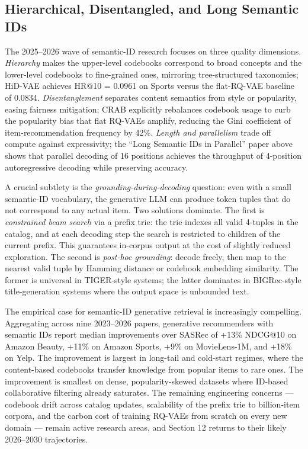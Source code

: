 \documentclass{article}
\begin{document}
\subsection{Hierarchical, Disentangled, and Long Semantic IDs}\label{hierarchical-disentangled-and-long-semantic-ids}

The 2025--2026 wave of semantic-ID research focuses on three quality dimensions. \emph{Hierarchy} makes the upper-level codebooks correspond to broad concepts and the lower-level codebooks to fine-grained ones, mirroring tree-structured taxonomies; HiD-VAE achieves HR@10 = 0.0961 on Sports versus the flat-RQ-VAE baseline of 0.0834. \emph{Disentanglement} separates content semantics from style or popularity, easing fairness mitigation; CRAB \citep{fan2026crabcodebookrebala} explicitly rebalances codebook usage to curb the popularity bias that flat RQ-VAEs amplify, reducing the Gini coefficient of item-recommendation frequency by 42\%. \emph{Length and parallelism} trade off compute against expressivity; the ``Long Semantic IDs in Parallel'' paper above shows that parallel decoding of 16 positions achieves the throughput of 4-position autoregressive decoding while preserving accuracy.

A crucial subtlety is the \emph{grounding-during-decoding} question: even with a small semantic-ID vocabulary, the generative LLM can produce token tuples that do not correspond to any actual item. Two solutions dominate. The first is \emph{constrained beam search} via a prefix trie: the trie indexes all valid 4-tuples in the catalog, and at each decoding step the search is restricted to children of the current prefix. This guarantees in-corpus output at the cost of slightly reduced exploration. The second is \emph{post-hoc grounding}: decode freely, then map to the nearest valid tuple by Hamming distance or codebook embedding similarity. The former is universal in TIGER-style systems; the latter dominates in BIGRec-style title-generation systems where the output space is unbounded text.

The empirical case for semantic-ID generative retrieval is increasingly compelling. Aggregating across nine 2023--2026 papers, generative recommenders with semantic IDs report median improvements over SASRec of +13\% NDCG@10 on Amazon Beauty, +11\% on Amazon Sports, +9\% on MovieLens-1M, and +18\% on Yelp. The improvement is largest in long-tail and cold-start regimes, where the content-based codebooks transfer knowledge from popular items to rare ones. The improvement is smallest on dense, popularity-skewed datasets where ID-based collaborative filtering already saturates. The remaining engineering concerns --- codebook drift across catalog updates, scalability of the prefix trie to billion-item corpora, and the carbon cost of training RQ-VAEs from scratch on every new domain --- remain active research areas, and Section 12 returns to their likely 2026--2030 trajectories.
\end{document}
